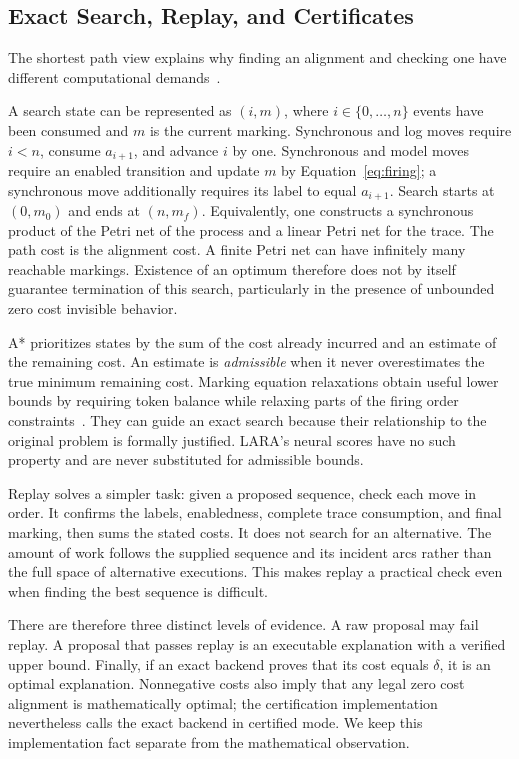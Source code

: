 \subsection{Exact Search, Replay, and Certificates}
\label{sec:exactprelim}

\begin{revised}The shortest path view explains why finding an alignment and checking one have different computational demands~\cite[Chapter~7]{Carmona2018}.\end{revised} A search state can be represented as $(i,m)$, where $i\in\{0,\ldots,n\}$ events have been consumed and $m$ is the current marking. Synchronous and log moves require $i<n$, consume $a_{i+1}$, and advance $i$ by one. Synchronous and model moves require an enabled transition and update $m$ by Equation~\eqref{eq:firing}; a synchronous move additionally requires its label to equal $a_{i+1}$. Search starts at $(0,m_0)$ and ends at $(n,m_f)$. Equivalently, one constructs a synchronous product of the Petri net of the process and a linear Petri net for the trace. The path cost is the alignment cost. A finite Petri net can have infinitely many reachable markings. Existence of an optimum therefore does not by itself guarantee termination of this search, particularly in the presence of unbounded zero cost invisible behavior.

A* prioritizes states by the sum of the cost already incurred and an estimate of the remaining cost. An estimate is \emph{admissible} when it never overestimates the true minimum remaining cost. Marking equation relaxations obtain useful lower bounds by requiring token balance while relaxing parts of the firing order constraints~\cite{Dongen2018}. They can guide an exact search because their relationship to the original problem is formally justified. LARA's neural scores have no such property and are never substituted for admissible bounds.

Replay solves a simpler task: given a proposed sequence, check each move in order. It confirms the labels, enabledness, complete trace consumption, and final marking, then sums the stated costs. It does not search for an alternative. The amount of work follows the supplied sequence and its incident arcs rather than the full space of alternative executions. This makes replay a practical check even when finding the best sequence is difficult.

There are therefore three distinct levels of evidence. A raw proposal may fail replay. A proposal that passes replay is an executable explanation with a verified upper bound. Finally, if an exact backend proves that its cost equals $\delta$, it is an optimal explanation. Nonnegative costs also imply that any legal zero cost alignment is mathematically optimal; the certification implementation nevertheless calls the exact backend in certified mode. We keep this implementation fact separate from the mathematical observation.


